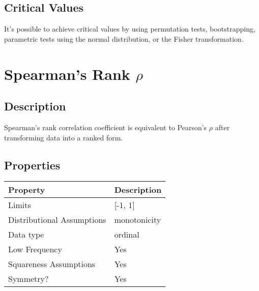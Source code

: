 \documentclass[11pt]{article}
\begin{document}
\subsection{Critical Values}
It's possible to achieve critical values by using permutation tests, bootstrapping, parametric tests using the normal distribution, or the Fisher transformation.







\section{Spearman's Rank $\rho$} %
\subsection{Description}
Spearman's rank correlation coefficient is equivalent to Pearson's $\rho$ after transforming data into a ranked form.

\subsection{Properties}
\begin{tabular}{| l || l |}
    \hline
    {\bf Property} & {\bf Description} \\
    \hline
    Limits & [-1, 1] \\ \hline

    Distributional Assumptions&  monotonicity \\ \hline

    Data type & ordinal \\ \hline

    Low Frequency & Yes \\ \hline

    Squareness Assumptions & Yes \\ \hline
    
    Symmetry? & Yes \\ \hline

\end{tabular}
\end{document}
